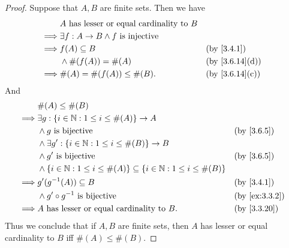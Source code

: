 \begin{proof}
	Suppose that \(A, B\) are finite sets.
	Then we have
	\begin{align*}
		         & A \text{ has lesser or equal cardinality to } B                                    \\
		\implies & \exists f : A \to B \land f \text{ is injective}                                   \\
		\implies & f(A) \subseteq B                                 &  & \by{3.4.1}                   \\
		         & \land \#(f(A)) = \#(A)                           &  & \text{(by \cref{3.6.14}(d))} \\
		\implies & \#(A) = \#(f(A)) \leq \#(B).                     &  & \text{(by \cref{3.6.14}(c))}
	\end{align*}
	And
	\begin{align*}
		         & \#(A) \leq \#(B)                                                                                             \\
		\implies & \exists g : \set{i \in \N : 1 \leq i \leq \#(A)} \to A                                                       \\
		         & \land g \text{ is bijective}                                                              &  & \by{3.6.5}    \\
		         & \land \exists g' : \set{i \in \N : 1 \leq i \leq \#(B)} \to B                                                \\
		         & \land g' \text{ is bijective}                                                             &  & \by{3.6.5}    \\
		         & \land \set{i \in \N : 1 \leq i \leq \#(A)} \subseteq \set{i \in \N : 1 \leq i \leq \#(B)}                    \\
		\implies & g'(g^{-1}(A)) \subseteq B                                                                 &  & \by{3.4.1}    \\
		         & \land g' \circ g^{-1} \text{ is bijective}                                                &  & \by{ex:3.3.2} \\
		\implies & A \text{ has lesser or equal cardinality to } B.                                          &  & \by{3.3.20}
	\end{align*}
	Thus we conclude that if \(A, B\) are finite sets, then \(A\) has lesser or equal cardinality to \(B\) iff \(\#(A) \leq \#(B)\).
\end{proof}

